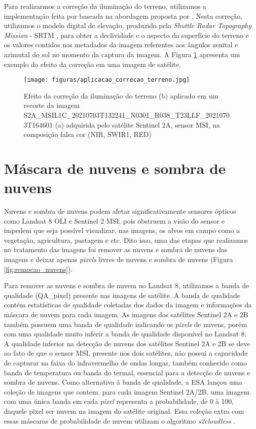 Para realizarmos a correção da iluminação do terreno, utilizamos a implementação feita por  baseada na abordagem proposta por . Nesta correção, utilizamos o modelo digital de elevação, produzido pela \textit{Shuttle Radar Topography Mission} - SRTM \cite{farr2007shuttle}, para obter a declividade e o aspecto da superfície do terreno e os valores contidos nos metadados da imagem referentes aos ângulos zenital e azimutal do sol no momento da captura da imagem. A Figura \ref{fig:correcao_iluminacao_terrano} apresenta um exemplo do efeito da correção em uma imagem de satélite. 

\begin{figure}[H]
\caption{Efeito da correção da iluminação do terreno (b)  aplicado em um recorte da imagem S2A\_MSIL1C\_20210703T132241\_N0301\_R038\_T23LLF\_20210703T164601 (a) adquirida pelo satélite Sentinel 2A, sensor MSI, na composição falsa cor (NIR, SWIR1, RED)}
\label{fig:correcao_iluminacao_terrano}
\centering
\texttt{[image: figuras/aplicacao\_correcao\_terreno.jpg]}
\end{figure}

\section{Máscara de nuvens e sombra de nuvens}

Nuvens e sombra de nuvens podem afetar significativamente sensores ópticos como Landsat 8 OLI e Sentinel 2 MSI,  pois obstruem a visão do sensor e impedem que seja possível visualizar, nas imagens, os alvos em campo como a vegetação, agricultura, pastagem e etc. Dito isso, uma das etapas que realizamos no tratamento das imagens foi remover as nuvens e sombra de nuvens das imagens e deixar apenas \textit{pixels} livres de nuvens e sombra de nuvens (Figura \ref{fig:remocao_nuvens}).  

Para remover as nuvens e sombra de nuvem no Landsat 8, utilizamos a banda de qualidade (QA\_pixel) presente nas imagens de satélite. A banda de qualidade contém estatísticas de qualidade coletadas dos dados da imagem e informações da máscara de nuvem para cada imagem. As imagens dos satélites Sentinel 2A e 2B também possuem uma banda de qualidade indicando os \textit{pixels} de nuvens, porém com uma qualidade muito inferir a banda de qualidade disponível no Landsat 8. A qualidade inferior na detecção de nuvens dos satélites Sentinel 2A e 2B se deve ao fato de que o sensor MSI, presente nos dois satélites, não possui a capacidade de capturar na faixa do infravermelho de ondas longas, também conhecido como banda de temperatura ou banda do termal, essencial para a detecção de nuvens e sombra de nuvens. Como alternativa à banda de qualidade, a ESA lançou uma coleção de imagens que contem, para cada imagem Sentinel 2A/2B, uma imagem com uma única banda em cada \textit{pixel} representa a probabilidade, de 0 à 100, daquele pixel ser nuvem na imagem do satélite original. Essa coleção extra com essas máscaras de probabilidade de nuvem utilizam o algoritmo \textit{s2cloudless} \cite{zupancimproving}. 

